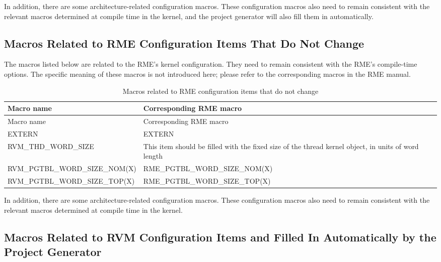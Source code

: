 In addition, there are some architecture-related configuration macros. These configuration macros also need to remain consistent with the relevant macros determined at compile time in the kernel, and the project generator will also fill them in automatically.

\subsection{Macros Related to RME Configuration Items That Do Not Change}\label{subsec:8-2-3}

The macros listed below are related to the RME's kernel configuration. They need to remain consistent with the RME's compile-time options. The specific meaning of these macros is not introduced here; please refer to the corresponding macros in the RME manual.

\begin{xltabular}{\textwidth}{@{}>{\hsize\raggedright\arraybackslash}X>{\hsize\raggedright\arraybackslash}X@{}}
\caption{Macros related to RME configuration items that do not change}\label{tab:8-4}\\
\toprule
Macro name & Corresponding RME macro\tabularnewline
\endfirsthead
\toprule
Macro name & Corresponding RME macro\tabularnewline
\midrule
\endhead
\bottomrule
\endlastfoot
EXTERN & EXTERN\tabularnewline
RVM\_\allowbreak{}THD\_\allowbreak{}WORD\_\allowbreak{}SIZE &
This item should be filled with the fixed size of the thread kernel object, in units of word length\tabularnewline
RVM\_\allowbreak{}PGTBL\_\allowbreak{}WORD\_\allowbreak{}SIZE\_\allowbreak{}NOM(X) &
RME\_\allowbreak{}PGTBL\_\allowbreak{}WORD\_\allowbreak{}SIZE\_\allowbreak{}NOM(X)\tabularnewline
RVM\_\allowbreak{}PGTBL\_\allowbreak{}WORD\_\allowbreak{}SIZE\_\allowbreak{}TOP(X) &
RME\_\allowbreak{}PGTBL\_\allowbreak{}WORD\_\allowbreak{}SIZE\_\allowbreak{}TOP(X)\tabularnewline
\end{xltabular}

In addition, there are some architecture-related configuration macros. These configuration macros also need to remain consistent with the relevant macros determined at compile time in the kernel.

\subsection{Macros Related to RVM Configuration Items and Filled In Automatically by the Project Generator}\label{subsec:8-2-4}

